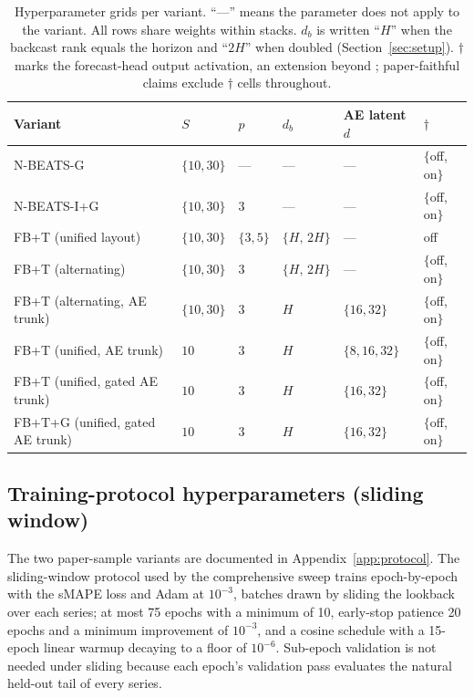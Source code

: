 \begin{table}[h]
\centering
\small
\caption{Hyperparameter grids per variant. ``---'' means the parameter does
not apply to the variant. All rows share weights within stacks. $d_b$ is
written ``$H$'' when the backcast rank equals the horizon and ``$2H$'' when
doubled (Section~\ref{sec:setup}). $\dagger$ marks the forecast-head output
activation, an extension beyond \citet{oreshkin2020nbeats}; paper-faithful
claims exclude $\dagger$ cells throughout.}
\label{tab:sweep_grids}
\begin{tabular}{@{}llllll@{}}
\toprule
Variant & $S$ & $p$ & $d_b$ & AE latent $d$ & $\dagger$ \\
\midrule
N-BEATS-G   & $\{10, 30\}$ & ---       & ---              & ---           & $\{$off, on$\}$ \\
N-BEATS-I+G & $\{10, 30\}$ & $3$       & ---              & ---           & $\{$off, on$\}$ \\
FB+T (unified layout)    & $\{10, 30\}$ & $\{3, 5\}$ & $\{H,\,2H\}$ & ---         & off \\
FB+T (alternating)       & $\{10, 30\}$ & $3$ & $\{H,\,2H\}$         & ---           & $\{$off, on$\}$ \\
FB+T (alternating, AE trunk)      & $\{10, 30\}$ & $3$ & $H$ & $\{16, 32\}$ & $\{$off, on$\}$ \\
FB+T (unified, AE trunk)          & $10$ & $3$ & $H$                & $\{8, 16, 32\}$ & $\{$off, on$\}$ \\
FB+T (unified, gated AE trunk)    & $10$ & $3$ & $H$                & $\{16, 32\}$ & $\{$off, on$\}$ \\
FB+T+G (unified, gated AE trunk)  & $10$ & $3$ & $H$                & $\{16, 32\}$ & $\{$off, on$\}$ \\
\bottomrule
\end{tabular}
\end{table}

\subsection{Training-protocol hyperparameters (sliding window)}
\label{app:hyperparams:sliding}

The two paper-sample variants are documented in
Appendix~\ref{app:protocol}. The sliding-window protocol used by the
comprehensive sweep trains epoch-by-epoch with the sMAPE loss and Adam at
$10^{-3}$, batches drawn by sliding the lookback over each series; at most
75 epochs with a minimum of 10, early-stop patience 20 epochs and a minimum
improvement of $10^{-3}$, and a cosine schedule with a 15-epoch linear
warmup decaying to a floor of $10^{-6}$. Sub-epoch validation is not needed
under sliding because each epoch's validation pass evaluates the natural
held-out tail of every series.

